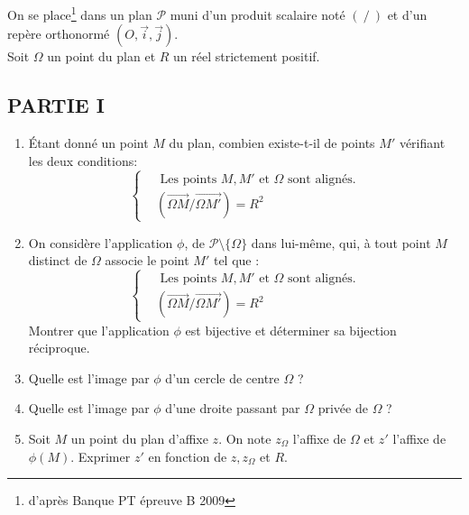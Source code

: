 On se place\footnote{d'après Banque PT épreuve B 2009} dans un plan $\mathcal P$ muni d'un produit scalaire noté $(\ /\ )$ et d'un repère orthonormé $(O,\vec{i},\vec{j})$.\\
Soit $\Omega$ un point du plan et $R$ un réel strictement positif.\\
\subsection*{PARTIE I}
\begin{enumerate}
\item \'Etant donné un point $M$ du plan, combien existe-t-il de points $M'$ vérifiant les deux conditions:
\begin{displaymath}
 \left\lbrace 
\begin{aligned}
 &\text{ Les points $M,M'$ et $\Omega$ sont alignés.} \\
 &(\overrightarrow{\Omega M}/\overrightarrow{\Omega M'})=R^2
\end{aligned}
\right. 
\end{displaymath}
\item On considère l'application $\phi$, de $\mathcal P\setminus \{\Omega\}$ dans lui-même, qui, à tout point $M$ distinct de $\Omega$ associe le point $M'$ tel que :
\begin{displaymath}
 \left\lbrace 
\begin{aligned}
 & \text{ Les points $M,M'$ et $\Omega$ sont alignés.} \\
 & (\overrightarrow{\Omega M}/\overrightarrow{\Omega M'})=R^2
\end{aligned}
\right. 
\end{displaymath}
Montrer que l'application $\phi$ est bijective et déterminer sa bijection réciproque.
\item Quelle est l'image par $\phi$ d'un cercle de centre $\Omega$ ?
\item Quelle est l'image par $\phi$ d'une droite passant par $\Omega$ privée de $\Omega$ ?
\item Soit $M$ un point du plan d'affixe $z$. On note $z_\Omega$ l'affixe de $\Omega$ et $z'$ l'affixe de $\phi(M)$.
Exprimer $z'$ en fonction de $z, z_\Omega$ et $R$.
\end{enumerate} 
